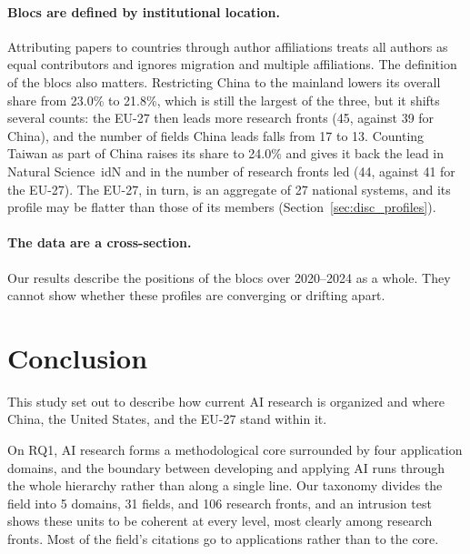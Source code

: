 \documentclass[10pt,twocolumn,a4paper]{article}
\newcommand{\cl}[3]{\textsf{#1}~\csname id#2\endcsname{#3}}
\begin{document}
	\paragraph{Blocs are defined by institutional location.} Attributing papers to countries through author affiliations treats all authors as equal contributors and ignores migration and multiple affiliations. The definition of the blocs also matters. Restricting China to the mainland lowers its overall share from 23.0\% to 21.8\%, which is still the largest of the three, but it shifts several counts: the EU-27 then leads more research fronts (45, against 39 for China), and the number of fields China leads falls from 17 to 13. Counting Taiwan as part of China raises its share to 24.0\% and gives it back the lead in \cl{Natural Science}{N}{3} and in the number of research fronts led (44, against 41 for the EU-27). The EU-27, in turn, is an aggregate of 27 national systems, and its profile may be flatter than those of its members (Section~\ref{sec:disc_profiles}).
	
	\paragraph{The data are a cross-section.} Our results describe the positions of the blocs over 2020--2024 as a whole. They cannot show whether these profiles are converging or drifting apart.
	
	\section{Conclusion}
	\label{sec:conclusion}
	
	This study set out to describe how current AI research is organized and where China, the United States, and the EU-27 stand within it.
	
	On RQ1, AI research forms a methodological core surrounded by four application domains, and the boundary between developing and applying AI runs through the whole hierarchy rather than along a single line. Our taxonomy divides the field into 5 domains, 31 fields, and 106 research fronts, and an intrusion test shows these units to be coherent at every level, most clearly among research fronts. Most of the field's citations go to applications rather than to the core.
	
\end{document}
